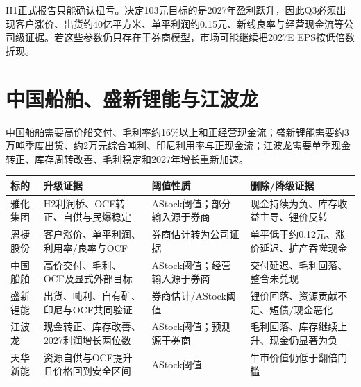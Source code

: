 H1正式报告只能确认扭亏。决定103元目标的是2027年盈利跃升，因此Q3必须出现客户涨价、出货约40亿平方米、单平利润约0.15元、新线良率与经营现金流等公司级证据。若这些参数仍只存在于券商模型，市场可能继续把2027E EPS按低倍数折现。

\section{中国船舶、盛新锂能与江波龙}

中国船舶需要高价船交付、毛利率约16\%以上和正经营现金流；盛新锂能需要约3万吨季度出货、约2万元综合吨利、印尼利用率与正现金流；江波龙需要单季现金转正、库存周转改善、毛利稳定和2027年增长重新加速。

\begin{exhibitbox}
\small
\begin{tabularx}{\exhibitboxwidth}{L{2.0cm} X L{2.4cm} X}
\toprule
标的 & 升级证据 & 阈值性质 & 删除/降级证据 \\
\midrule
雅化集团 & H2利润桥、OCF转正、自供与民爆稳定 & AStock阈值；部分输入源于券商 & 现金持续为负、库存收益主导、锂价反转 \\
恩捷股份 & 客户涨价、单平利润、利用率/良率与OCF & 券商估计转为公司证据 & 单平低于约0.12元、涨价延迟、扩产吞噬现金 \\
中国船舶 & 高价交付、毛利、OCF及显式外部目标 & AStock阈值；经营输入源于券商 & 交付延迟、毛利回落、整合未兑现 \\
盛新锂能 & 出货、吨利、自有矿、印尼与OCF共同验证 & 券商估计/AStock阈值 & 锂价回落、资源贡献不足、短债/现金恶化 \\
江波龙 & 现金转正、库存改善、2027利润增长两位数 & AStock阈值；预测源于券商 & 毛利回落、库存继续上升、现金仍显著为负 \\
天华新能 & 资源自供与OCF提升且价格回到安全区间 & AStock阈值 & 牛市价值仍低于翻倍门槛 \\
\bottomrule
\end{tabularx}
\end{exhibitbox}

\clearpage
